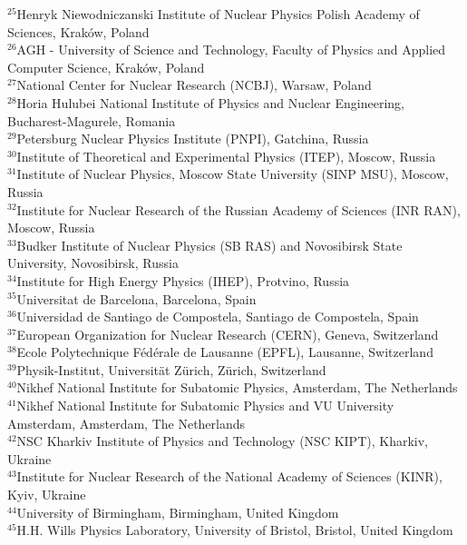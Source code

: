\documentclass[12pt,a4paper]{article}
\begin{document}
\begin{flushleft}
{$ ^{25}$Henryk Niewodniczanski Institute of Nuclear Physics  Polish Academy of Sciences, Krak\'{o}w, Poland\\
$ ^{26}$AGH - University of Science and Technology, Faculty of Physics and Applied Computer Science, Krak\'{o}w, Poland\\
$ ^{27}$National Center for Nuclear Research (NCBJ), Warsaw, Poland\\
$ ^{28}$Horia Hulubei National Institute of Physics and Nuclear Engineering, Bucharest-Magurele, Romania\\
$ ^{29}$Petersburg Nuclear Physics Institute (PNPI), Gatchina, Russia\\
$ ^{30}$Institute of Theoretical and Experimental Physics (ITEP), Moscow, Russia\\
$ ^{31}$Institute of Nuclear Physics, Moscow State University (SINP MSU), Moscow, Russia\\
$ ^{32}$Institute for Nuclear Research of the Russian Academy of Sciences (INR RAN), Moscow, Russia\\
$ ^{33}$Budker Institute of Nuclear Physics (SB RAS) and Novosibirsk State University, Novosibirsk, Russia\\
$ ^{34}$Institute for High Energy Physics (IHEP), Protvino, Russia\\
$ ^{35}$Universitat de Barcelona, Barcelona, Spain\\
$ ^{36}$Universidad de Santiago de Compostela, Santiago de Compostela, Spain\\
$ ^{37}$European Organization for Nuclear Research (CERN), Geneva, Switzerland\\
$ ^{38}$Ecole Polytechnique F\'{e}d\'{e}rale de Lausanne (EPFL), Lausanne, Switzerland\\
$ ^{39}$Physik-Institut, Universit\"{a}t Z\"{u}rich, Z\"{u}rich, Switzerland\\
$ ^{40}$Nikhef National Institute for Subatomic Physics, Amsterdam, The Netherlands\\
$ ^{41}$Nikhef National Institute for Subatomic Physics and VU University Amsterdam, Amsterdam, The Netherlands\\
$ ^{42}$NSC Kharkiv Institute of Physics and Technology (NSC KIPT), Kharkiv, Ukraine\\
$ ^{43}$Institute for Nuclear Research of the National Academy of Sciences (KINR), Kyiv, Ukraine\\
$ ^{44}$University of Birmingham, Birmingham, United Kingdom\\
$ ^{45}$H.H. Wills Physics Laboratory, University of Bristol, Bristol, United Kingdom\\
}
\end{flushleft}
\end{document}
